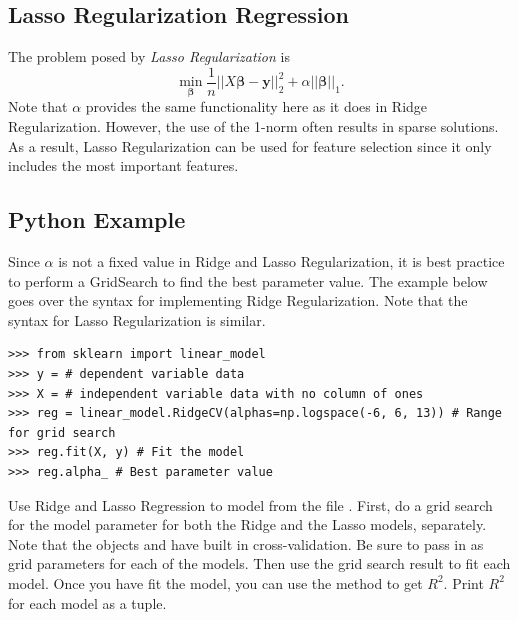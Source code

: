 \subsection*{Lasso Regularization Regression}
The problem posed by \textit{Lasso Regularization} is \[ \min_{\boldsymbol\beta} \frac{1}{n} \vert\vert X\boldsymbol\beta - \boldsymbol y \vert\vert_2^2 + \alpha \vert\vert \boldsymbol\beta \vert\vert_1. \]
Note that $\alpha$ provides the same functionality here as it does in Ridge Regularization. However, the use of the 1-norm often results in sparse solutions. 
As a result, Lasso Regularization can be used for feature selection since it only includes the most important features.

\subsection*{Python Example}
Since $\alpha$ is not a fixed value in Ridge and Lasso Regularization, it is best practice to perform a GridSearch to find the best parameter value. 
The example below goes over the syntax for implementing Ridge Regularization. Note that the syntax for Lasso Regularization is similar.

\begin{lstlisting}
>>> from sklearn import linear_model
>>> y = # dependent variable data
>>> X = # independent variable data with no column of ones
>>> reg = linear_model.RidgeCV(alphas=np.logspace(-6, 6, 13)) # Range for grid search 
>>> reg.fit(X, y) # Fit the model
>>> reg.alpha_ # Best parameter value 
\end{lstlisting} 


\begin{problem}
Use Ridge and Lasso Regression to model  from the file . 
First, do a grid search for the model parameter for both the Ridge and the Lasso models, separately.
Note that the objects  and  have built in cross-validation.
Be sure to pass in  as grid parameters for each of the models. 
Then use the grid search result to fit each model.
Once you have fit the model, you can use the  method to get $R^2$. 
Print $R^2$ for each model as a tuple. 
\end{problem}






